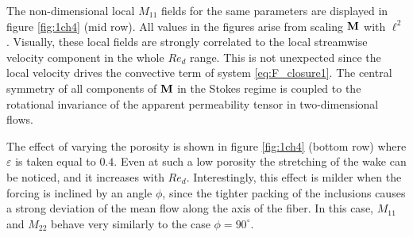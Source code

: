 The non-dimensional local $M_{11}$ fields for the same parameters are displayed in figure \ref{fig:1ch4} (mid row). All values in the figures 
arise from scaling $\bf{M}$ with $\ell^2$. Visually, these local fields are strongly correlated to the local streamwise velocity component in the whole $Re_d$ range. 
This is not unexpected since the local velocity drives the convective term of system \eqref{eq:F_closure1}. 
The central symmetry of all components of $\bf{M}$ in the Stokes regime is coupled to the rotational invariance of the apparent permeability tensor in two-dimensional flows.

The effect of varying the porosity is shown in figure \ref{fig:1ch4} (bottom row) where $\varepsilon$ is taken equal to $0.4$. Even at such a
low porosity the stretching of the wake can be noticed, and it increases with $Re_d$. Interestingly, this effect is milder when
the forcing is inclined by an angle $\phi$, since the tighter packing of the inclusions causes a strong deviation of the mean flow along the axis of the fiber. In this case, $M_{11}$ and $M_ {22}$ behave very similarly to the case $\phi = 90^{\circ}$.    


